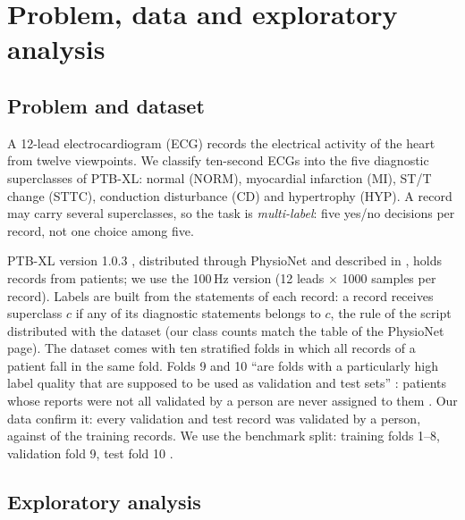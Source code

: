 \section{Problem, data and exploratory analysis}\label{sec:data}

\subsection{Problem and dataset}

A 12-lead electrocardiogram (ECG) records the electrical activity of the heart from twelve
viewpoints. We classify ten-second ECGs into the five diagnostic superclasses of PTB-XL: normal
(NORM), myocardial infarction (MI), ST/T change (STTC), conduction disturbance (CD) and hypertrophy
(HYP). A record may carry several superclasses, so the task is \emph{multi-label}: five yes/no
decisions per record, not one choice among five.

PTB-XL version 1.0.3 \cite{ptbxl_physionet}, distributed through PhysioNet \cite{pollard2026physionet} and described in \cite{wagner2020ptbxl}, holds
\edaNRecordsAll{} records from \edaNPatientsAll{} patients; we use the 100\,Hz version (12 leads
$\times$ 1000 samples per record). Labels are built from the statements of each record: a record
receives superclass $c$ if any of its diagnostic statements belongs to $c$, the rule of the script
distributed with the dataset (our class counts match the table of the PhysioNet page). The dataset
comes with ten stratified folds in which all records of a patient fall in the same fold. Folds 9 and
10 ``are folds with a particularly high label quality that are supposed to be used as validation and
test sets'' \cite[p.~4]{wagner2020ptbxl}: patients whose reports were not all validated by a person
are never assigned to them \cite[p.~12]{wagner2020ptbxl}. Our data confirm it: every validation and
test record was validated by a person, against \edaFracValidatedByHumanTrainPct{} of the training
records. We use the benchmark split: training folds 1--8, validation fold 9, test fold 10
\cite{strodthoff2021deep}.

\subsection{Exploratory analysis}


